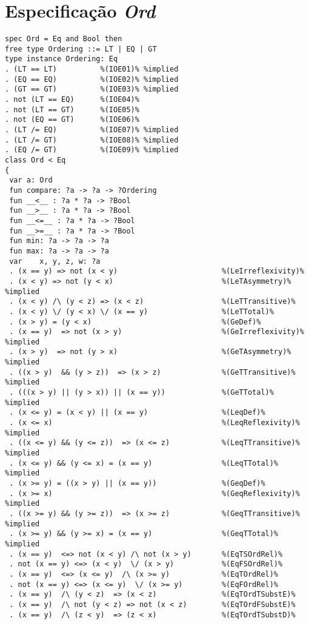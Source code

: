 \section{Especificação \textit{Ord}}
\label{appendix:lazySpec:ord}
\begin{Verbatim}
spec Ord = Eq and Bool then
free type Ordering ::= LT | EQ | GT
type instance Ordering: Eq
. (LT == LT)          %(IOE01)% %implied
. (EQ == EQ)          %(IOE02)% %implied
. (GT == GT)          %(IOE03)% %implied
. not (LT == EQ)      %(IOE04)%
. not (LT == GT)      %(IOE05)%
. not (EQ == GT)      %(IOE06)%
. (LT /= EQ)          %(IOE07)% %implied
. (LT /= GT)          %(IOE08)% %implied
. (EQ /= GT)          %(IOE09)% %implied
class Ord < Eq
{
 var a: Ord
 fun compare: ?a -> ?a -> ?Ordering
 fun __<__ : ?a * ?a -> ?Bool
 fun __>__ : ?a * ?a -> ?Bool
 fun __<=__ : ?a * ?a -> ?Bool
 fun __>=__ : ?a * ?a -> ?Bool
 fun min: ?a -> ?a -> ?a
 fun max: ?a -> ?a -> ?a
 var    x, y, z, w: ?a
 . (x == y) => not (x < y)                        %(LeIrreflexivity)%
 . (x < y) => not (y < x)                         %(LeTAsymmetry)% %implied
 . (x < y) /\ (y < z) => (x < z)                  %(LeTTransitive)%
 . (x < y) \/ (y < x) \/ (x == y)                 %(LeTTotal)%
 . (x > y) = (y < x)                              %(GeDef)%
 . (x == y)  => not (x > y)                       %(GeIrreflexivity)% %implied
 . (x > y)  => not (y > x)                        %(GeTAsymmetry)% %implied
 . ((x > y)  && (y > z))  => (x > z)              %(GeTTransitive)% %implied
 . (((x > y) || (y > x)) || (x == y))             %(GeTTotal)% %implied 
 . (x <= y) = (x < y) || (x == y)                 %(LeqDef)%
 . (x <= x)                                       %(LeqReflexivity)% %implied
 . ((x <= y) && (y <= z))  => (x <= z)            %(LeqTTransitive)% %implied
 . (x <= y) && (y <= x) = (x == y)                %(LeqTTotal)% %implied
 . (x >= y) = ((x > y) || (x == y))               %(GeqDef)%
 . (x >= x)                                       %(GeqReflexivity)% %implied 
 . ((x >= y) && (y >= z))  => (x >= z)            %(GeqTTransitive)% %implied
 . (x >= y) && (y >= x) = (x == y)                %(GeqTTotal)% %implied
 . (x == y)  <=> not (x < y) /\ not (x > y)       %(EqTSOrdRel)%
 . not (x == y) <=> (x < y)  \/ (x > y)           %(EqFSOrdRel)%
 . (x == y)  <=> (x <= y)  /\ (x >= y)            %(EqTOrdRel)%
 . not (x == y) <=> (x <= y)  \/ (x >= y)         %(EqFOrdRel)%
 . (x == y)  /\ (y < z)  => (x < z)               %(EqTOrdTSubstE)%
 . (x == y)  /\ not (y < z) => not (x < z)        %(EqTOrdFSubstE)%
 . (x == y)  /\ (z < y)  => (z < x)               %(EqTOrdTSubstD)%

\end{Verbatim}
